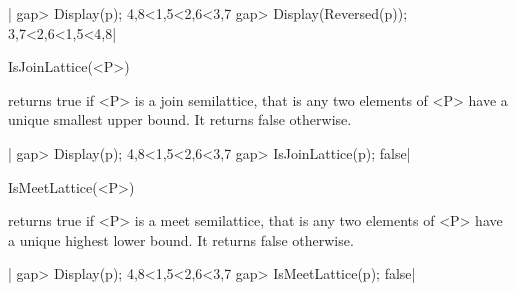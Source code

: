 |    gap> Display(p);
    4,8<1,5<2,6<3,7
    gap> Display(Reversed(p));
    3,7<2,6<1,5<4,8|

%

IsJoinLattice(<P>)

returns  true if <P> is a join semilattice, that is any two elements of <P>
have a unique smallest upper bound. It returns false otherwise.

|    gap> Display(p);
    4,8<1,5<2,6<3,7
    gap> IsJoinLattice(p);
    false|

%

IsMeetLattice(<P>)

returns  true if <P> is a meet semilattice, that is any two elements of <P>
have a unique highest lower bound. It returns false otherwise.

|    gap> Display(p);
    4,8<1,5<2,6<3,7
    gap> IsMeetLattice(p);
    false|

